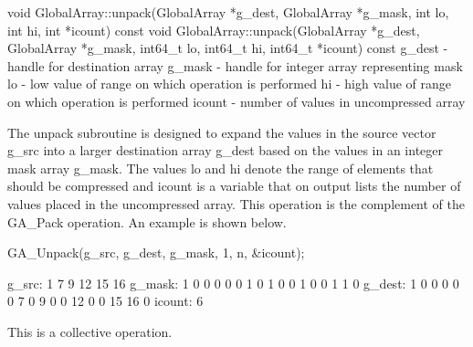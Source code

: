\documentclass[12pt]{article}
\begin{document}
\begin{cxxapi}
void GlobalArray::unpack(GlobalArray *g_dest, GlobalArray *g_mask,
                         int lo, int hi, int *icount) const
void GlobalArray::unpack(GlobalArray *g_dest, GlobalArray *g_mask,
                         int64_t lo, int64_t hi, int64_t *icount) const
   g_dest      - handle for destination array                                   \access{[output]}
   g_mask      - handle for integer array representing mask                     \access{[input]}
   lo          - low value of range on which operation is performed             \access{[input]}
   hi          - high value of range on which operation is performed            \access{[input]}
   icount      - number of values in uncompressed array                         \access{[output]}
\end{cxxapi}


\begin{desc}

The unpack subroutine is designed to expand the values in the source vector g_src into a larger destination array g_dest based on the values in an integer mask array g_mask. The values lo and hi denote the range of elements that should be compressed and icount is a variable that on output lists the number of values placed in the uncompressed array. This operation is the complement of the GA_Pack operation. An example is shown below.

\begin{codeseg}
 GA_Unpack(g_src, g_dest, g_mask, 1, n, \&icount);

g_src:    1  7  9 12 15 16
g_mask:   1  0  0  0  0  0  1  0  1  0  0  1  0  0  1  1  0
g_dest:   1  0  0  0  0  0  7  0  9  0  0 12  0  0 15 16  0
icount:   6
\end{codeseg}

This is a collective operation.

\end{desc}
\end{document}
